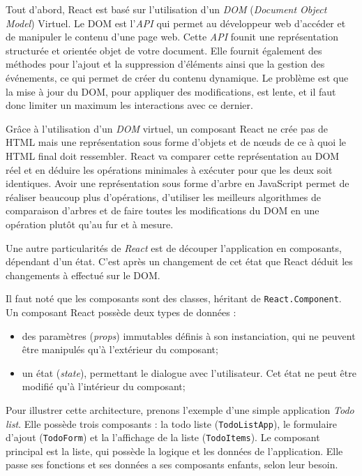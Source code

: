 \bigskip

Tout d'abord, React est basé sur l'utilisation d'un \emph{DOM}
(\emph{Document Object Model}) Virtuel. Le DOM est l'\emph{API} qui
permet au développeur web d'accéder et de manipuler le contenu d'une
page web. Cette \emph{API} founit une représentation structurée et
orientée objet de votre document. Elle fournit également des méthodes
pour l'ajout et la suppression d'éléments ainsi que la gestion des
événements, ce qui permet de créer du contenu dynamique. Le problème est
que la mise à jour du DOM, pour appliquer des modifications, est lente,
et il faut donc limiter un maximum les interactions avec ce dernier.

\bigskip

Grâce à l'utilisation d'un \emph{DOM} virtuel, un composant React ne
crée pas de HTML mais une représentation sous forme d'objets et de nœuds
de ce à quoi le HTML final doit ressembler. React va comparer cette
représentation au DOM réel et en déduire les opérations minimales à
exécuter pour que les deux soit identiques. Avoir une représentation
sous forme d'arbre en JavaScript permet de réaliser beaucoup plus
d'opérations, d'utiliser les meilleurs algorithmes de comparaison
d'arbres et de faire toutes les modifications du DOM en une opération
plutôt qu'au fur et à mesure.

\bigskip

Une autre particularités de \emph{React} est de découper l'application
en composants, dépendant d'un état. C'est après un changement de cet
état que React déduit les changements à effectué sur le DOM.

\bigskip

Il faut noté que les composants sont des classes, héritant de
\texttt{React.Component}. Un composant React possède deux types de
données :

\begin{itemize}
\tightlist
\item
  des paramètres (\emph{props}) immutables définis à son instanciation,
  qui ne peuvent être manipulés qu'à l'extérieur du composant;
\item
  un état (\emph{state}), permettant le dialogue avec l'utilisateur. Cet
  état ne peut être modifié qu'à l'intérieur du composant;
\end{itemize}

\bigskip

Pour illustrer cette architecture, prenons l'exemple d'une simple
application \emph{Todo list}. Elle possède trois composants : la todo
liste (\texttt{TodoListApp}), le formulaire d'ajout (\texttt{TodoForm})
et la l'affichage de la liste (\texttt{TodoItems}). Le composant
principal est la liste, qui possède la logique et les données de
l'application. Elle passe ses fonctions et ses données a ses composants
enfants, selon leur besoin.

